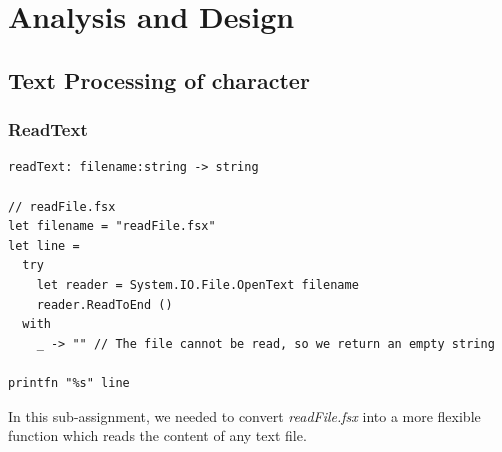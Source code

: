 \documentclass{article}
\begin{document}




\section{Analysis and Design}

\subsection{Text Processing of character}
\subsubsection{ReadText}
\begin{lstlisting}
readText: filename:string -> string

// readFile.fsx
let filename = "readFile.fsx"
let line = 
  try
    let reader = System.IO.File.OpenText filename
    reader.ReadToEnd ()
  with
    _ -> "" // The file cannot be read, so we return an empty string
    
printfn "%s" line
\end{lstlisting}

In this sub-assignment, we needed to convert \emph{readFile.fsx} into a more flexible function which reads the content of any text file.
\end{document}
